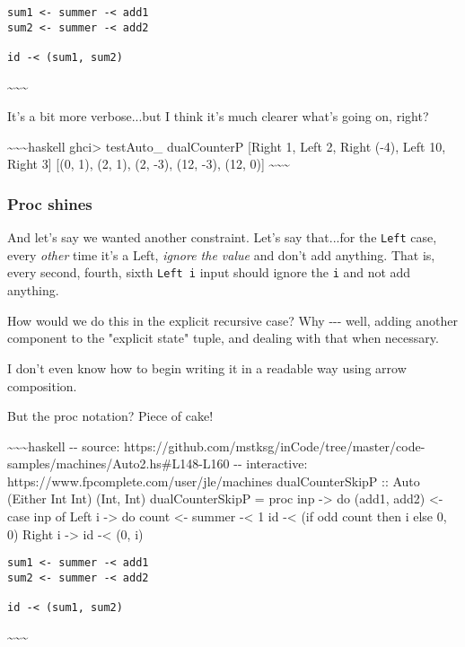 \documentclass[]{article}
\begin{document}
\begin{verbatim}
sum1 <- summer -< add1
sum2 <- summer -< add2

id -< (sum1, sum2)
\end{verbatim}

\textasciitilde{}\textasciitilde{}\textasciitilde{}

It's a bit more verbose...but I think it's much clearer what's going on, right?

\textasciitilde{}\textasciitilde{}\textasciitilde{}haskell ghci\textgreater{}
testAuto\_ dualCounterP {[}Right 1, Left 2, Right (-4), Left 10, Right 3{]}
{[}(0, 1), (2, 1), (2, -3), (12, -3), (12, 0){]}
\textasciitilde{}\textasciitilde{}\textasciitilde{}

\subsubsection{Proc shines}

And let's say we wanted another constraint. Let's say that...for the
\texttt{Left} case, every \emph{other} time it's a Left, \emph{ignore the value}
and don't add anything. That is, every second, fourth, sixth \texttt{Left\ i}
input should ignore the \texttt{i} and not add anything.

How would we do this in the explicit recursive case? Why -\/-\/- well, adding
another component to the "explicit state" tuple, and dealing with that when
necessary.

I don't even know how to begin writing it in a readable way using arrow
composition.

But the proc notation? Piece of cake!

\textasciitilde{}\textasciitilde{}\textasciitilde{}haskell -\/- source:
https://github.com/mstksg/inCode/tree/master/code-samples/machines/Auto2.hs\#L148-L160
-\/- interactive: https://www.fpcomplete.com/user/jle/machines dualCounterSkipP
:: Auto (Either Int Int) (Int, Int) dualCounterSkipP = proc inp -\textgreater{}
do (add1, add2) \textless{}- case inp of Left i -\textgreater{} do count
\textless{}- summer -\textless{} 1 id -\textless{} (if odd count then i else 0,
0) Right i -\textgreater{} id -\textless{} (0, i)

\begin{verbatim}
sum1 <- summer -< add1
sum2 <- summer -< add2

id -< (sum1, sum2)
\end{verbatim}

\textasciitilde{}\textasciitilde{}\textasciitilde{}
\end{document}
